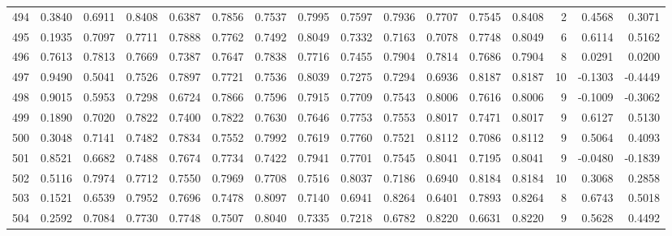 \begin{tabular}{lrrrrrrrrrrrrrrr}
494 &      0.3840 &  0.6911 &  0.8408 &  0.6387 &  0.7856 &  0.7537 &  0.7995 &  0.7597 &  0.7936 &  0.7707 &   0.7545 &     0.8408 &      2 &                    0.4568 &                     0.3071 \\
495 &      0.1935 &  0.7097 &  0.7711 &  0.7888 &  0.7762 &  0.7492 &  0.8049 &  0.7332 &  0.7163 &  0.7078 &   0.7748 &     0.8049 &      6 &                    0.6114 &                     0.5162 \\
496 &      0.7613 &  0.7813 &  0.7669 &  0.7387 &  0.7647 &  0.7838 &  0.7716 &  0.7455 &  0.7904 &  0.7814 &   0.7686 &     0.7904 &      8 &                    0.0291 &                     0.0200 \\
497 &      0.9490 &  0.5041 &  0.7526 &  0.7897 &  0.7721 &  0.7536 &  0.8039 &  0.7275 &  0.7294 &  0.6936 &   0.8187 &     0.8187 &     10 &                   -0.1303 &                    -0.4449 \\
498 &      0.9015 &  0.5953 &  0.7298 &  0.6724 &  0.7866 &  0.7596 &  0.7915 &  0.7709 &  0.7543 &  0.8006 &   0.7616 &     0.8006 &      9 &                   -0.1009 &                    -0.3062 \\
499 &      0.1890 &  0.7020 &  0.7822 &  0.7400 &  0.7822 &  0.7630 &  0.7646 &  0.7753 &  0.7553 &  0.8017 &   0.7471 &     0.8017 &      9 &                    0.6127 &                     0.5130 \\
500 &      0.3048 &  0.7141 &  0.7482 &  0.7834 &  0.7552 &  0.7992 &  0.7619 &  0.7760 &  0.7521 &  0.8112 &   0.7086 &     0.8112 &      9 &                    0.5064 &                     0.4093 \\
501 &      0.8521 &  0.6682 &  0.7488 &  0.7674 &  0.7734 &  0.7422 &  0.7941 &  0.7701 &  0.7545 &  0.8041 &   0.7195 &     0.8041 &      9 &                   -0.0480 &                    -0.1839 \\
502 &      0.5116 &  0.7974 &  0.7712 &  0.7550 &  0.7969 &  0.7708 &  0.7516 &  0.8037 &  0.7186 &  0.6940 &   0.8184 &     0.8184 &     10 &                    0.3068 &                     0.2858 \\
503 &      0.1521 &  0.6539 &  0.7952 &  0.7696 &  0.7478 &  0.8097 &  0.7140 &  0.6941 &  0.8264 &  0.6401 &   0.7893 &     0.8264 &      8 &                    0.6743 &                     0.5018 \\
504 &      0.2592 &  0.7084 &  0.7730 &  0.7748 &  0.7507 &  0.8040 &  0.7335 &  0.7218 &  0.6782 &  0.8220 &   0.6631 &     0.8220 &      9 &                    0.5628 &                     0.4492 \\

\end{tabular}
